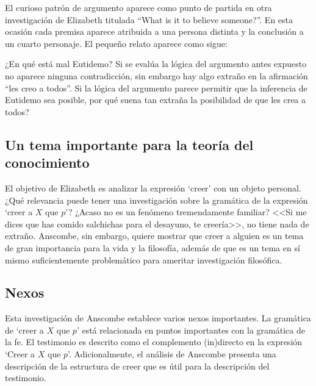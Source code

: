 El curioso patrón de argumento aparece como punto de partida en otra
investigación de Elizabeth titulada ``What is it to believe someone?''. En esta
ocasión cada premisa aparece atribuida a una persona distinta y la conclusión a
un cuarto personaje. El pequeño relato aparece como sigue: 

  ¿En qué está mal Eutidemo? Si se evalúa la lógica del argumento antes expuesto
  no aparece ninguna contradicción, sin embargo hay algo extraño en la afirmación
  ``les creo a todos''. Si la lógica del argumento parece permitir que la
  inferencia de Eutidemo sea posible, por qué suena tan extraña la posibilidad de
  que les crea a todos?

\subsection{Un tema importante para la teoría del conocimiento}
El objetivo de Elizabeth es analizar la expresión `creer' con un objeto
personal. ¿Qué relevancia puede tener una investigación sobre la gramática de la
expresión `creer a $X$ que $p$'? ¿Acaso no es un fenómeno tremendamente
familiar? <<Si me dices que has comido salchichas para el desayuno, te
creería>>, no tiene nada de extraño. Anscombe, sin embargo, quiere mostrar que
creer a alguien es un tema de gran importancia para la vida y la filosofía,
además de que es un tema en sí mismo suficientemente problemático para ameritar
investigación filosófica.

\subsection{Nexos}
Esta investigación de Anscombe establece varios nexos importantes. La gramática
de `creer a $X$ que $p$' está relacionada en puntos importantes con la gramática
de la fe. El testimonio es descrito como el complemento (in)directo en la
expresión `Creer a $X$ que $p$'. Adicionalmente, el análisis de Anscombe
presenta una descripción de la estructura de creer que es útil para la
descripción del testimonio.

